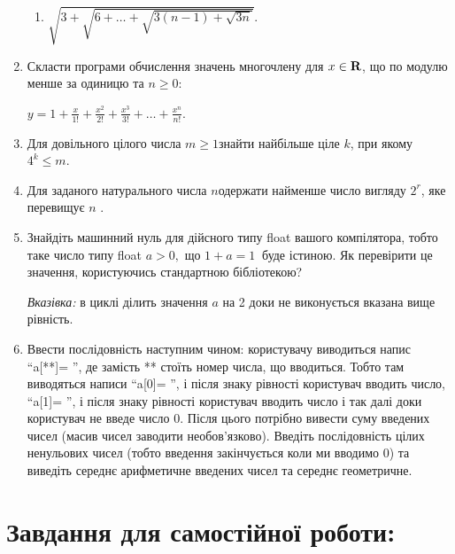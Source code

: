\documentclass[a5paper,titlepage,openany,twoside,
]
{book_unv}%
\makeatletter
\newcommand{\xslalph}[1]{\expandafter\@xslalph\csname c@#1\endcsname}
\newcommand{\@xslalph}[1]{%
    \ifcase#1\or а\or б\or в\or г\or д\or e\or є\or ж\or з\or i%
    \or й\or к\or л\or м\or н\or о\or п\or р\or с\or т%
    \or у\or ф\or х\or ц\or ч\or ш\or ю\or я\or аа\or бб\or вв%
    \else\@ctrerr\fi%
}
\makeatother
\begin{document}
\begin{enumerate}
\begin{enumerate}[label=\xslalph*)]
\item
 \(\sqrt{3 + \sqrt{6 + \ldots + \sqrt{3(n - 1) + \sqrt{3n}}}}.\)

\end{enumerate}

\item
  Скласти програми обчислення значень многочлену для 
  \(x \in \bf{R}\), що по модулю менше за одиницю та
  \( n \geq 0\):

\(y = 1 + \frac{x}{1!} + \frac{x^{2}}{2!} + \frac{x^{3}}{3!} + \ldots + \frac{x^{n}}{n!} \).

\item
  Для довільного цілого числа \(m \geq 1\)знайти найбільше ціле \(k\),
  при якому \(4^{k} \leq m\).
\item
  Для заданого натурального числа \(n\)одержати найменше число вигляду
  \(2^{r}\), яке перевищує \(n\) .
\item
  Знайдіть машинний нуль для дійсного типу float вашого компілятора, тобто таке число типу float
  \(a > 0,\) що \(1 + a = 1\ \) буде істиною. 
 Як перевірити це значення, користуючись стандартною бібліотекою?

\emph{Вказівка:} в циклі ділить значення \(a\) на 2 доки не виконується
вказана вище рівність. 

\item
  Ввести послідовність наступним чином: користувачу виводиться напис
  ``a{[}**{]}= '', де замість ** стоїть номер числа, що вводиться. Тобто
  там виводяться написи ``a{[}0{]}= '', і після знаку рівності
  користувач вводить число, ``a{[}1{]}= '', і після знаку рівності
  користувач вводить число і так далі доки користувач не введе число 0.
  Після цього потрібно вивести суму введених чисел (масив чисел заводити
  необов'язково). Введіть послідовність цілих ненульових чисел (тобто введення
  закінчується коли ми вводимо 0) та виведіть середнє арифметичне
  введених чисел та середнє геометричне.

\end{enumerate}

\section{Завдання для самостійної роботи:}
\end{document}
